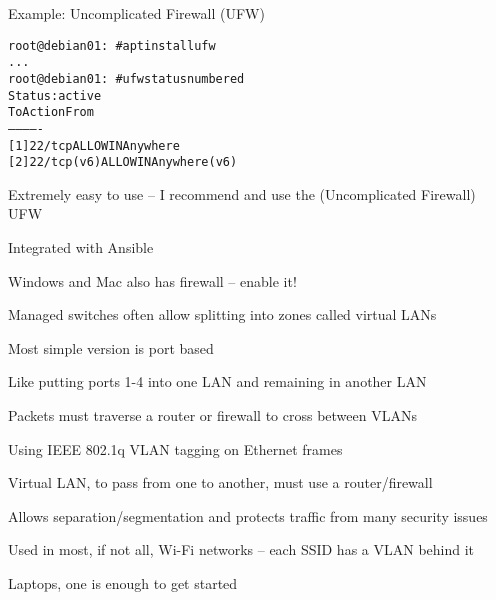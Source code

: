 \documentclass[Screen16to9,17pt]{foils}
\begin{document}
Example: Uncomplicated Firewall (UFW)

\begin{alltt}\small
root@debian01:~# apt install ufw
...
root@debian01:~# ufw status numbered
Status: active
     To                         Action      From
     --                         ------      ----
[ 1] 22/tcp                     ALLOW IN    Anywhere
[ 2] 22/tcp (v6)                ALLOW IN    Anywhere (v6)
\end{alltt}

\begin{list2}
\item Extremely easy to use -- I recommend and use the (Uncomplicated Firewall) UFW
\item Integrated with Ansible
\item Windows and Mac also has firewall -- enable it!
\end{list2}




\begin{list1}
\item Managed switches often allow splitting into zones called virtual LANs
\item Most simple version is port based
\item Like putting ports 1-4 into one LAN and remaining in another LAN
\item Packets must traverse a router or firewall to cross between VLANs
\end{list1}



\begin{list1}
\item Using IEEE 802.1q  VLAN tagging on Ethernet frames
\item Virtual LAN, to pass from one to another, must use a router/firewall
\item Allows separation/segmentation and protects traffic from many security issues
\item Used in most, if not all, Wi-Fi networks -- each SSID has a VLAN behind it
\end{list1}



Laptops, one is enough to get started
\end{document}
